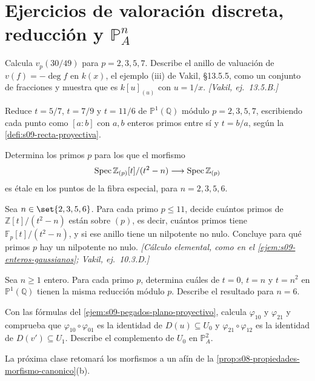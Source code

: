 \section{Ejercicios de valoración discreta, reducción y \texorpdfstring{$\mathbb P^n_A$}{PnA}}

\begin{ejer}[Valuaciones]
\label{ejer:s09-valuaciones}
Calcula $v_p(30/49)$ para $p=2,3,5,7$. Describe el anillo de valuación de $v(f)=-\deg f$ en $k(x)$, el ejemplo (iii) de Vakil, \S13.5.5, como un conjunto de fracciones y muestra que es $k[u]_{(u)}$ con $u=1/x$. \emph{[Vakil, ej.~13.5.B.]}
\end{ejer}

\begin{ejer}
\label{ejer:s09-reduccion-puntos}
Reduce $t=5/7$, $t=7/9$ y $t=11/6$ de $\mathbb P^1(\mathbb Q)$ módulo $p=2,3,5,7$, escribiendo cada punto como $[a:b]$ con $a,b$ enteros primos entre sí y $t=b/a$, según la \cref{defi:s09-recta-proyectiva}.
\end{ejer}

\begin{ejer}
\label{ejer:s09-modelos-etale}
Determina los primos $p$ para los que el morfismo
\[
\operatorname{Spec}\mathbb Z_{(p)}[t]/(t^2-n)\longrightarrow\operatorname{Spec}\mathbb Z_{(p)}
\]
es étale en los puntos de la fibra especial, para $n=2,3,5,6$.
\end{ejer}

\begin{ejer}
\label{ejer:s09-primos-cuadraticos-reduccion}
Sea $n\in\set{2,3,5,6}$. Para cada primo $p\le11$, decide cuántos primos de $\mathbb Z[t]/(t^2-n)$ están sobre $(p)$, es decir, cuántos primos tiene $\mathbb F_p[t]/(t^2-n)$, y si ese anillo tiene un nilpotente no nulo. Concluye para qué primos $p$ hay un nilpotente no nulo. \emph{[Cálculo elemental, como en el \cref{ejem:s09-enteros-gaussianos}; Vakil, ej.~10.3.D.]}
\end{ejer}

\begin{ejer}
\label{ejer:s09-tres-puntos}
Sea $n\ge1$ entero. Para cada primo $p$, determina cuáles de $t=0$, $t=n$ y $t=n^2$ en $\mathbb P^1(\mathbb Q)$ tienen la misma reducción módulo $p$. Describe el resultado para $n=6$.
\end{ejer}

\begin{ejer}
\label{ejer:s09-pegados-inversos}
Con las fórmulas del \cref{ejem:s09-pegados-plano-proyectivo}, calcula $\varphi_{10}$ y $\varphi_{21}$ y comprueba que $\varphi_{10}\circ\varphi_{01}$ es la identidad de $D(u)\subseteq U_0$ y $\varphi_{21}\circ\varphi_{12}$ es la identidad de $D(v')\subseteq U_1$. Describe el complemento de $U_0$ en $\mathbb P^2_A$.
\end{ejer}

La próxima clase retomará los morfismos a un afín de la \cref{prop:s08-propiedades-morfismo-canonico}(b).

